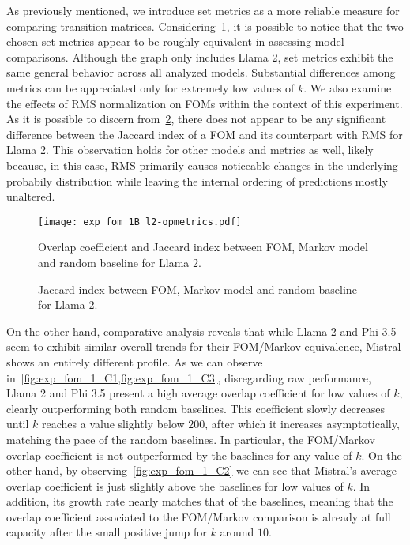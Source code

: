 As previously mentioned, we introduce set metrics as a more reliable measure for comparing transition matrices.
Considering~\cref{fig:exp_fom_1_B1}, it is possible to notice that the two chosen set metrics appear to be roughly equivalent in assessing model comparisons.
Although the graph only includes Llama 2, set metrics exhibit the same general behavior across all analyzed models.
Substantial differences among metrics can be appreciated only for extremely low values of $k$.
We also examine the effects of RMS normalization on FOMs within the context of this experiment.
As it is possible to discern from~\cref{fig:exp_fom_1_B}, there does not appear to be any significant difference between the Jaccard index of a FOM and its counterpart with RMS for Llama 2.
This observation holds for other models and metrics as well, likely because, in this case, RMS primarily causes noticeable changes in the underlying probabily distribution while leaving the internal ordering of predictions mostly unaltered.

\begin{figure}[t!]
    \centering
    \texttt{[image: exp\_fom\_1B\_l2-opmetrics.pdf]}
    \caption[Overlap coefficient and Jaccard index for Llama 2.]{Overlap coefficient and Jaccard index between FOM, Markov model and random baseline for Llama 2.}
    \label{fig:exp_fom_1_B1}
\end{figure}
\begin{figure}[t!]
    \caption[Jaccard index for Llama 2 considering FOM and FOM with RMS.]{Jaccard index between FOM, Markov model and random baseline for Llama 2.}
    \label{fig:exp_fom_1_B}
\end{figure}

On the other hand, comparative analysis reveals that while Llama 2 and Phi 3.5 seem to exhibit similar overall trends for their FOM/Markov equivalence, Mistral shows an entirely different profile.
As we can observe in~\cref{fig:exp_fom_1_C1,fig:exp_fom_1_C3}, disregarding raw performance, Llama 2 and Phi 3.5 present a high average overlap coefficient for low values of $k$, clearly outperforming both random baselines.
This coefficient slowly decreases until $k$ reaches a value slightly below $200$, after which it increases asymptotically, matching the pace of the random baselines.
In particular, the FOM/Markov overlap coefficient is not outperformed by the baselines for any value of $k$.
On the other hand, by observing~\cref{fig:exp_fom_1_C2} we can see that Mistral's average overlap coefficient is just slightly above the baselines for low values of $k$.
In addition, its growth rate nearly matches that of the baselines, meaning that the overlap coefficient associated to the FOM/Markov comparison is already at full capacity after the small positive jump for $k$ around $10$.


